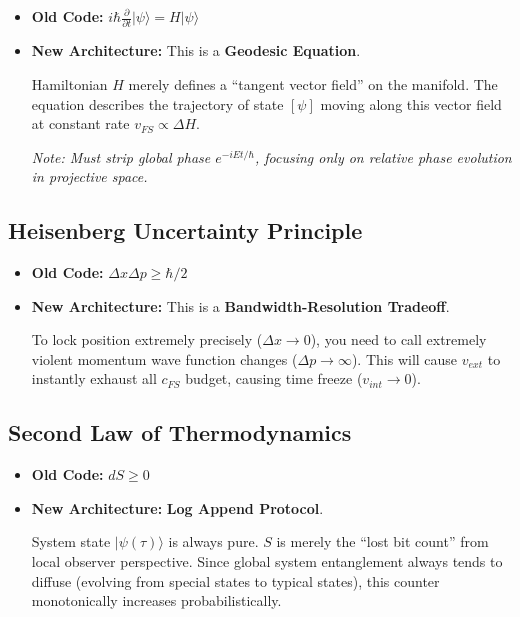 \documentclass[11pt,a4paper,twoside]{book}
\begin{document}
\begin{itemize}
\item \textbf{Old Code:} $i\hbar \frac{\partial}{\partial t} |\psi\rangle = H |\psi\rangle$

\item \textbf{New Architecture:} This is a \textbf{Geodesic Equation}.

Hamiltonian $H$ merely defines a ``tangent vector field'' on the manifold. The equation describes the trajectory of state $[\psi]$ moving along this vector field at constant rate $v_{FS} \propto \Delta H$.

\textit{Note: Must strip global phase $e^{-iEt/\hbar}$, focusing only on relative phase evolution in projective space.}
\end{itemize}

\subsection{Heisenberg Uncertainty Principle}

\begin{itemize}
\item \textbf{Old Code:} $\Delta x \Delta p \ge \hbar/2$

\item \textbf{New Architecture:} This is a \textbf{Bandwidth-Resolution Tradeoff}.

To lock position extremely precisely ($\Delta x \to 0$), you need to call extremely violent momentum wave function changes ($\Delta p \to \infty$). This will cause $v_{ext}$ to instantly exhaust all $c_{FS}$ budget, causing time freeze ($v_{int} \to 0$).
\end{itemize}

\subsection{Second Law of Thermodynamics}

\begin{itemize}
\item \textbf{Old Code:} $dS \ge 0$

\item \textbf{New Architecture:} \textbf{Log Append Protocol}.

System state $|\psi(\tau)\rangle$ is always pure. $S$ is merely the ``lost bit count'' from local observer perspective. Since global system entanglement always tends to diffuse (evolving from special states to typical states), this counter monotonically increases probabilistically.
\end{itemize}
\end{document}
